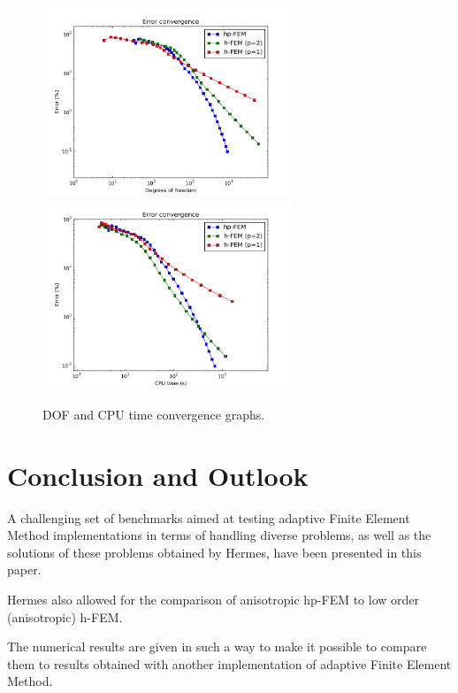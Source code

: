 \documentclass[12pt]{elsarticle}
\begin{document}
\begin{figure}[H]
\centering
\hspace{-50mm}
\includegraphics[width=7.5cm]{nist/nist-12/conv_dof_aniso.png}\ \
\hspace{-10mm}
\includegraphics[width=7.5cm]{nist/nist-12/conv_cpu_aniso.png}
\hspace{-50mm}
\caption{DOF and CPU time convergence graphs.}
\label{fig:nist-12-conv}
\end{figure}
\vspace{-8mm}

\section{Conclusion and Outlook}
\label{sec:conclusion}

A challenging set of benchmarks aimed at testing adaptive Finite Element Method implementations in terms of handling diverse problems, as well as the solutions of these problems obtained by Hermes, have been presented in this paper.

Hermes also allowed for the comparison of anisotropic hp-FEM to low order (anisotropic) h-FEM.

The numerical results are given in such a way to make it possible to compare them to results obtained with another implementation of adaptive Finite Element Method.
\end{document}
